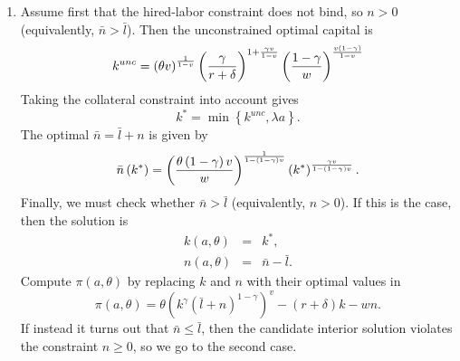 \documentclass[11pt,fleqn]{article}
\begin{document}
\begin{enumerate}
	\item Assume first that the hired-labor constraint does not bind, so $n>0$ (equivalently, $\bar{n}>\bar{l}$). Then the unconstrained optimal capital is%
	\begin{equation*}
		k^{unc}=\left( \theta v\right) ^{\frac{1}{1-v}}\left( \frac{\gamma }{%
			r+\delta }\right) ^{1+\frac{\gamma v}{1-v}}\left( \frac{1-\gamma }{w}\right)
		^{\frac{v\left( 1-\gamma \right) }{1-v}}
	\end{equation*}%
	Taking the collateral constraint into account gives%
	\begin{equation*}
		k^{\ast }=\min \left\{ k^{unc},\lambda a\right\} .
	\end{equation*}%
	The optimal $\bar{n}=\bar{l}+n$ is given by%
	\begin{equation*}
		\bar{n}\left( k^{\ast }\right) =\left( \frac{\theta \left( 1-\gamma \right) v}{w}\right) ^{%
			\frac{1}{1-\left( 1-\gamma \right) v}}\left( k^{\ast }\right) ^{\frac{\gamma v}{1-\left( 1-\gamma
				\right) v}}.
	\end{equation*}%
	Finally, we must check whether $\bar{n}>\bar{l}$ (equivalently, $n>0$). If this is the case, then the solution is%
	\begin{eqnarray*}
		k\left( a,\theta \right) &=&k^{\ast }, \\
		n\left( a,\theta \right) &=&\bar{n}-\bar{l}.
	\end{eqnarray*}%
	Compute $\pi \left( a,\theta \right)$ by replacing $k$ and $n$ with their optimal values in%
	\begin{equation*}
		\pi \left( a,\theta \right) =\theta \left( k^{\gamma }\left( \bar{l}+n\right)
		^{1-\gamma }\right) ^{v}-\left( r+\delta \right) k-wn.
	\end{equation*}%
	If instead it turns out that $\bar{n}\leq \bar{l}$, then the candidate interior solution violates the constraint $n\geq 0$, so we go to the second
	case.
	

\end{enumerate}
\end{document}
